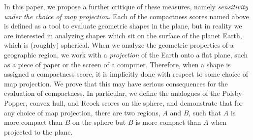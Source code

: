In this paper, we propose a further critique of these measures, namely
\textit{sensitivity under the choice of map projection}.  Each of the
compactness scores named above is defined as a tool to evaluate
geometric shapes in the plane, but in reality we are interested in
analyzing shapes which sit on the surface of the planet Earth, which
is (roughly) spherical.  
When we analyze the geometric properties of a geographic region, we work 
with a \textit{projection} of the Earth onto a flat plane, such as a piece of 
paper or the screen of a computer.
Therefore, when a shape is assigned a compactness score,
it is implicitly done with respect to some choice of map projection.
We prove that this may have
serious consequences for the evaluation of compactness.  In
particular, we define the analogues of the Polsby-Popper, convex hull,
and Reock scores on the sphere, and demonstrate that for any choice of
map projection, there are two regions, $A$ and $B$, such that $A$ is
more compact than $B$ on the sphere but $B$ is more compact than $A$
when projected to the plane.